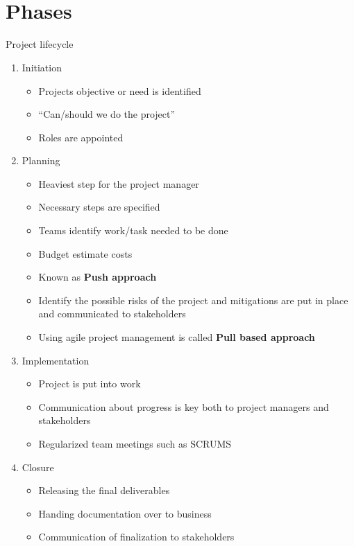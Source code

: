 \documentclass[12pt]{report}
\title{\Huge{}\\}
\author{\huge{}}
\date{}
\begin{document}

\section{Phases}
Project lifecycle
\begin{enumerate}
  \item Initiation
        \begin{itemize}
                \item Projects objective or need is identified
                \item ``Can/should we do the project''
                \item Roles are appointed
        \end{itemize}
  \item Planning
        \begin{itemize}
          \item Heaviest step for the project manager
          \item Necessary steps are specified
          \item Teams identify work/task needed to be done
        \item Budget estimate costs
                \item Known as \textbf{Push approach}
                \item Identify the possible risks of the project and mitigations are put in place and communicated to stakeholders
                \item Using agile project management is called \textbf{Pull based approach}
        \end{itemize}
  \item Implementation
        \begin{itemize}
          \item Project is put into work
          \item Communication about progress is key both to project managers and stakeholders
                \item Regularized team meetings such as SCRUMS
        \end{itemize}
  \item Closure
        \begin{itemize}
          \item Releasing the final deliverables
          \item Handing documentation over to business
                \item Communication of finalization to stakeholders
        \end{itemize}
\end{enumerate}
\end{document}
